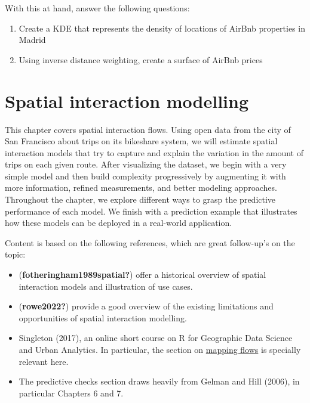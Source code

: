 \documentclass[
  letterpaper,
  krantz2]{style/krantz}
\providecommand{\tightlist}{%
  \setlength{\itemsep}{0pt}\setlength{\parskip}{0pt}}\usepackage{longtable,booktabs,array}
\begin{document}
With this at hand, answer the following questions:

\begin{enumerate}
\def\labelenumi{\arabic{enumi}.}
\tightlist
\item
  Create a KDE that represents the density of locations of AirBnb
  properties in Madrid
\item
  Using inverse distance weighting, create a surface of AirBnb prices
\end{enumerate}

\hypertarget{spatial-interaction-modelling}{%
\chapter{Spatial interaction
modelling}\label{spatial-interaction-modelling}}

This chapter covers spatial interaction flows. Using open data from the
city of San Francisco about trips on its bikeshare system, we will
estimate spatial interaction models that try to capture and explain the
variation in the amount of trips on each given route. After visualizing
the dataset, we begin with a very simple model and then build complexity
progressively by augmenting it with more information, refined
measurements, and better modeling approaches. Throughout the chapter, we
explore different ways to grasp the predictive performance of each
model. We finish with a prediction example that illustrates how these
models can be deployed in a real-world application.

Content is based on the following references, which are great
follow-up's on the topic:

\begin{itemize}
\tightlist
\item
  (\textbf{fotheringham1989spatial?}) offer a historical overview of
  spatial interaction models and illustration of use cases.
\item
  (\textbf{rowe2022?}) provide a good overview of the existing
  limitations and opportunities of spatial interaction modelling.
\item
  Singleton (2017), an online short course on R for Geographic Data
  Science and Urban Analytics. In particular, the section on
  \href{https://github.com/alexsingleton/GDS_UA_2017/tree/master/Mapping_Flows}{mapping
  flows} is specially relevant here.
\item
  The predictive checks section draws heavily from Gelman and Hill
  (2006), in particular Chapters 6 and 7.
\end{itemize}
\end{document}
